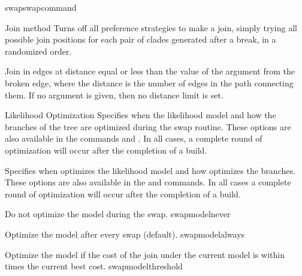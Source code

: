 \begin{command}{swap}{swapcommand}
\begin{arguments}
\begin{argumentgroup}{Join method}
                {Turns off all preference strategies to make a join, simply trying
                all possible join positions for each pair of clades generated
                after a break, in a randomized order.}
                {}

                {Join in edges at distance equal or less than the value of the argument
                from the broken edge, where the distance is the number of edges
                in the path connecting them. If no argument is given, then no
                distance limit is set.}
                {}
            
        \end{argumentgroup}

        \begin{argumentgroup}{Likelihood Optimization}
            {Specifies when the likelihood model and how the branches of the
            tree are optimized during the swap routine. These options are also
            available in the commands  and .
            In all cases, a complete round of optimization will occur
            after the completion of a build.}

                {Specifies when \poy optimizes the likelihood model and how \poy optimizes
                the branches. These options are also available in the
                 and  commands. In all cases a
                complete round of optimization will occur after the completion of a
                build.
                
                \begin{description}

                        {Do not optimize the model during the swap.}
                        {swapmodelnever}

                        {Optimize the model after every swap (default).}
                        {swapmodelalways}

                        {Optimize the model if the cost of the join under the
                        current model is within  times the
                        current best cost.}
                        {swapmodelthreshold}


\end{description}}
\end{argumentgroup}
\end{arguments}
\end{command}

